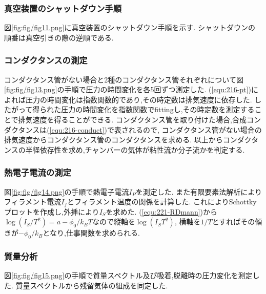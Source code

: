 \subsubsection{真空装置のシャットダウン手順}
図\ref{fig:fig/fig11.png}に真空装置のシャットダウン手順を示す.
シャットダウンの順番は真空引きの際の逆順である.
\subsubsection{コンダクタンスの測定}
コンダクタンス管がない場合と2種のコンダクタンス管それぞれについて図\ref{fig:fig/fig13.png}の手順で圧力の時間変化を各5回ずつ測定した.
(\ref{equ:216-pt})によれば圧力の時間変化は指数関数的であり,その時定数は排気速度に依存した.
したがって得られた圧力の時間変化を指数関数でfittingし,その時定数を測定することで排気速度を得ることができる.
コンダクタンス管を取り付けた場合,合成コンダクタンスは(\ref{equ:216-conduct})で表されるので,
コンダクタンス管がない場合の排気速度からコンダクタンス管のコンダクタンスを求める.
以上からコンダクタンスの半径依存性を求め,チャンバーの気体が粘性流か分子流かを判定する.
\subsubsection{熱電子電流の測定}
図\ref{fig:fig/fig14.png}の手順で熱電子電流$I_P$を測定した.
また有限要素法解析によりフィラメント電流$I_f$とフィラメント温度の関係を計算した.
これによりSchottkyプロットを作成し,外挿により$I_S$を求めた.
(\ref{equ:221-RDmann})から$\log(I_S/T^2)=a-\phi_0/k_BT$なので縦軸を$\log(I_ST^2)$,
横軸を$1/T$とすればその傾きが$-\phi_0/k_B$となり,仕事関数を求められる.
\newpage
\subsubsection{質量分析}
図\ref{fig:fig/fig15.png}の手順で質量スペクトル及び吸着,脱離時の圧力変化を測定した.
質量スペクトルから残留気体の組成を同定した.
